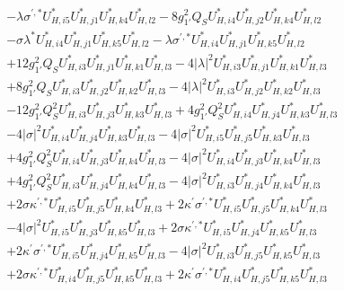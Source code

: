 \begin{align}
 &- \lambda \sigma^{\prime,*} U^*_{{H},{i 5}} U^*_{{H},{j 1}} U^*_{{H},{k 4}} U^*_{{H},{l 2}} -8 g_{1'}^{2} Q_{S} U^*_{{H},{i 4}} U^*_{{H},{j 2}} U^*_{{H},{k 4}} U^*_{{H},{l 2}} \nonumber \\ 
 &- \sigma \lambda^* U^*_{{H},{i 4}} U^*_{{H},{j 1}} U^*_{{H},{k 5}} U^*_{{H},{l 2}} - \lambda \sigma^{\prime,*} U^*_{{H},{i 4}} U^*_{{H},{j 1}} U^*_{{H},{k 5}} U^*_{{H},{l 2}} \nonumber \\ 
 &+12 g_{1'}^{2} Q_{S} U^*_{{H},{i 3}} U^*_{{H},{j 1}} U^*_{{H},{k 1}} U^*_{{H},{l 3}} -4 |\lambda|^2 U^*_{{H},{i 3}} U^*_{{H},{j 1}} U^*_{{H},{k 1}} U^*_{{H},{l 3}} \nonumber \\ 
 &+8 g_{1'}^{2} Q_{S} U^*_{{H},{i 3}} U^*_{{H},{j 2}} U^*_{{H},{k 2}} U^*_{{H},{l 3}} -4 |\lambda|^2 U^*_{{H},{i 3}} U^*_{{H},{j 2}} U^*_{{H},{k 2}} U^*_{{H},{l 3}} \nonumber \\ 
 &-12 g_{1'}^{2} Q_{S}^{2} U^*_{{H},{i 3}} U^*_{{H},{j 3}} U^*_{{H},{k 3}} U^*_{{H},{l 3}} +4 g_{1'}^{2} Q_{S}^{2} U^*_{{H},{i 4}} U^*_{{H},{j 4}} U^*_{{H},{k 3}} U^*_{{H},{l 3}} \nonumber \\ 
 &-4 |\sigma|^2 U^*_{{H},{i 4}} U^*_{{H},{j 4}} U^*_{{H},{k 3}} U^*_{{H},{l 3}} -4 |\sigma|^2 U^*_{{H},{i 5}} U^*_{{H},{j 5}} U^*_{{H},{k 3}} U^*_{{H},{l 3}} \nonumber \\ 
 &+4 g_{1'}^{2} Q_{S}^{2} U^*_{{H},{i 4}} U^*_{{H},{j 3}} U^*_{{H},{k 4}} U^*_{{H},{l 3}} -4 |\sigma|^2 U^*_{{H},{i 4}} U^*_{{H},{j 3}} U^*_{{H},{k 4}} U^*_{{H},{l 3}} \nonumber \\ 
 &+4 g_{1'}^{2} Q_{S}^{2} U^*_{{H},{i 3}} U^*_{{H},{j 4}} U^*_{{H},{k 4}} U^*_{{H},{l 3}} -4 |\sigma|^2 U^*_{{H},{i 3}} U^*_{{H},{j 4}} U^*_{{H},{k 4}} U^*_{{H},{l 3}} \nonumber \\ 
 &+2 \sigma \kappa^{\prime,*} U^*_{{H},{i 5}} U^*_{{H},{j 5}} U^*_{{H},{k 4}} U^*_{{H},{l 3}} +2 \kappa^\prime \sigma^{\prime,*} U^*_{{H},{i 5}} U^*_{{H},{j 5}} U^*_{{H},{k 4}} U^*_{{H},{l 3}} \nonumber \\ 
 &-4 |\sigma|^2 U^*_{{H},{i 5}} U^*_{{H},{j 3}} U^*_{{H},{k 5}} U^*_{{H},{l 3}} +2 \sigma \kappa^{\prime,*} U^*_{{H},{i 5}} U^*_{{H},{j 4}} U^*_{{H},{k 5}} U^*_{{H},{l 3}} \nonumber \\ 
 &+2 \kappa^\prime \sigma^{\prime,*} U^*_{{H},{i 5}} U^*_{{H},{j 4}} U^*_{{H},{k 5}} U^*_{{H},{l 3}} -4 |\sigma|^2 U^*_{{H},{i 3}} U^*_{{H},{j 5}} U^*_{{H},{k 5}} U^*_{{H},{l 3}} \nonumber \\ 
 &+2 \sigma \kappa^{\prime,*} U^*_{{H},{i 4}} U^*_{{H},{j 5}} U^*_{{H},{k 5}} U^*_{{H},{l 3}} +2 \kappa^\prime \sigma^{\prime,*} U^*_{{H},{i 4}} U^*_{{H},{j 5}} U^*_{{H},{k 5}} U^*_{{H},{l 3}} \nonumber \\ 

\end{align}
